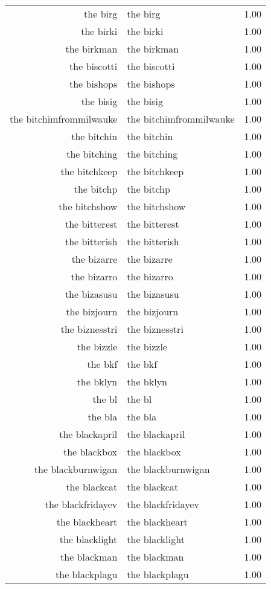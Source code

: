 \begin{table}[ht]
\begin{tabular}{rlr}
  the birg & the birg & 1.00 \\ 
  the birki & the birki & 1.00 \\ 
  the birkman & the birkman & 1.00 \\ 
  the biscotti & the biscotti & 1.00 \\ 
  the bishops & the bishops & 1.00 \\ 
  the bisig & the bisig & 1.00 \\ 
  the bitchimfrommilwauke & the bitchimfrommilwauke & 1.00 \\ 
  the bitchin & the bitchin & 1.00 \\ 
  the bitching & the bitching & 1.00 \\ 
  the bitchkeep & the bitchkeep & 1.00 \\ 
  the bitchp & the bitchp & 1.00 \\ 
  the bitchshow & the bitchshow & 1.00 \\ 
  the bitterest & the bitterest & 1.00 \\ 
  the bitterish & the bitterish & 1.00 \\ 
  the bizarre & the bizarre & 1.00 \\ 
  the bizarro & the bizarro & 1.00 \\ 
  the bizasusu & the bizasusu & 1.00 \\ 
  the bizjourn & the bizjourn & 1.00 \\ 
  the biznesstri & the biznesstri & 1.00 \\ 
  the bizzle & the bizzle & 1.00 \\ 
  the bkf & the bkf & 1.00 \\ 
  the bklyn & the bklyn & 1.00 \\ 
  the bl & the bl & 1.00 \\ 
  the bla & the bla & 1.00 \\ 
  the blackapril & the blackapril & 1.00 \\ 
  the blackbox & the blackbox & 1.00 \\ 
  the blackburnwigan & the blackburnwigan & 1.00 \\ 
  the blackcat & the blackcat & 1.00 \\ 
  the blackfridayev & the blackfridayev & 1.00 \\ 
  the blackheart & the blackheart & 1.00 \\ 
  the blacklight & the blacklight & 1.00 \\ 
  the blackman & the blackman & 1.00 \\ 
  the blackplagu & the blackplagu & 1.00 \\ 

\end{tabular}
\end{table}

